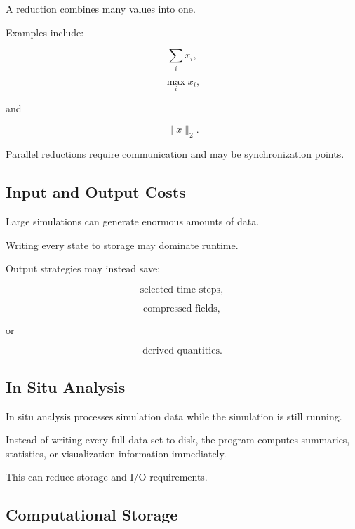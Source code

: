 A reduction combines many values into one.

Examples include:

\[
\boxed{
\sum_i x_i,
}
\]

\[
\boxed{
\max_i x_i,
}
\]

and

\[
\boxed{
\|x\|_2.
}
\]

Parallel reductions require communication and may be synchronization
points.

\subsection{Input and Output Costs}
\label{subsec:scientific-io}

Large simulations can generate enormous amounts of data.

Writing every state to storage may dominate runtime.

Output strategies may instead save:

\[
\boxed{
\text{selected time steps},
}
\]

\[
\boxed{
\text{compressed fields},
}
\]

or

\[
\boxed{
\text{derived quantities}.
}
\]

\subsection{In Situ Analysis}
\label{subsec:in-situ-analysis}

In situ analysis processes simulation data while the simulation is still
running.

Instead of writing every full data set to disk, the program computes
summaries, statistics, or visualization information immediately.

This can reduce storage and I/O requirements.

\subsection{Computational Storage}
\label{subsec:computational-storage}

